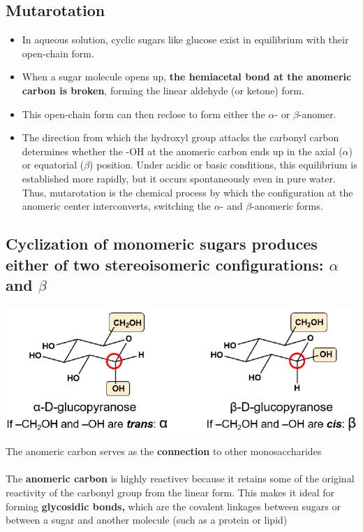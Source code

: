 \documentclass[10pt]{article}
\begin{document}
\subsection*{Mutarotation}
\begin{itemize}
    \item In aqueous solution, cyclic sugars like glucose exist in equilibrium with their open-chain form.
    \item  When a sugar molecule opens up, \textbf{the hemiacetal bond at the anomeric carbon is broken}, forming the linear aldehyde (or ketone) form.
    \item This open-chain form can then reclose to form either the $\alpha$- or $\beta$-anomer.
    \item The direction from which the hydroxyl group attacks the carbonyl carbon determines whether the -OH at the anomeric carbon ends up in the axial ($\alpha$) or equatorial ($\beta$) position. Under acidic or basic conditions, this equilibrium is established more rapidly, but it occurs spontaneously even in pure water. Thus, mutarotation is the chemical process by which the configuration at the anomeric center interconverts, switching the $\alpha$- and $\beta$-anomeric forms.    
\end{itemize}

\subsection*{Cyclization of monomeric sugars produces either of two stereoisomeric configurations: $\alpha$ and $\beta$}
\begin{center}
    \includegraphics*[width=\textwidth]{L1_8.png}
\end{center}
The anomeric carbon serves as the \textbf{connection} to other monosaccharides\\\\
The \textbf{anomeric carbon} is highly reactivev because it retains some of the original reactivity of the carbonyl group from the linear form.  This makes it ideal for forming \textbf{glycosidic bonds,} which are the covalent linkages between sugars or between a sugar and another molecule (such as a protein or lipid)
\end{document}
